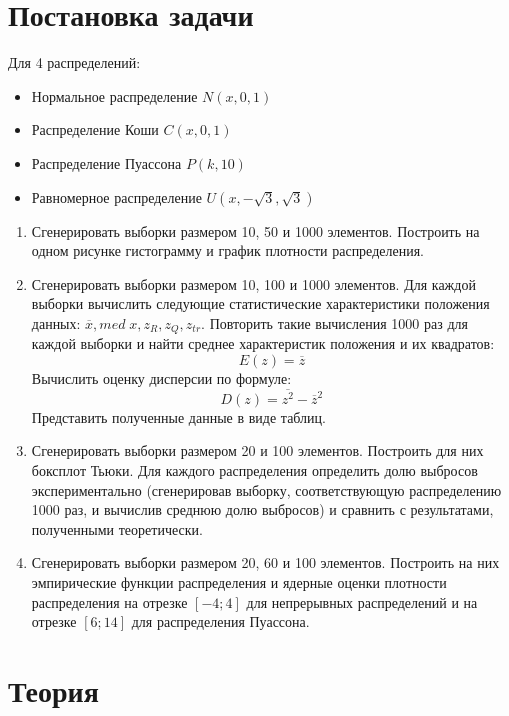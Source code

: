 \documentclass{article}
\begin{document}
\section{Постановка задачи}
Для 4 распределений:

\begin{itemize}
    \item Нормальное распределение $N(x,0,1)$
    \item Распределение Коши $C(x,0,1)$
    \item Распределение Пуассона $P(k,10)$
    \item Равномерное распределение $U(x,-\sqrt{3},\sqrt{3})$
\end{itemize}
\begin{enumerate}
    \item Сгенерировать выборки размером 10, 50 и 1000 элементов.
    Построить на одном рисунке гистограмму и график плотности распределения.
    \item Сгенерировать выборки размером 10, 100 и 1000 элементов.
    Для каждой выборки вычислить следующие статистические характеристики положения данных: $\overline{x}, med \; x, z_R, z_Q, z_{tr}$. Повторить такие вычисления 1000 раз для каждой выборки и найти среднее характеристик положения и их квадратов:
    \begin{equation}
    E(z)=\overline{z}
    \end{equation}
    Вычислить оценку дисперсии по формуле:
    \begin{equation}
    D(z)=\overline{z^2}-\overline{z}^2
    \end{equation}
    Представить полученные данные в виде таблиц.
    \item Сгенерировать выборки размером 20 и 100 элементов. Построить для них боксплот Тьюки. Для каждого распределения определить долю выбросов экспериментально (сгенерировав выборку, соответствующую распределению 1000 раз, и вычислив среднюю долю выбросов) и сравнить с результатами, полученными теоретически.
    \item Сгенерировать выборки размером 20, 60 и 100 элементов. Построить на них эмпирические функции распределения и ядерные оценки плотности распределения на отрезке $[−4; 4]$ для непрерывных распределений и на отрезке $[6; 14]$ для распределения Пуассона.


\end{enumerate}

\newpage

\section{Теория}
\end{document}
